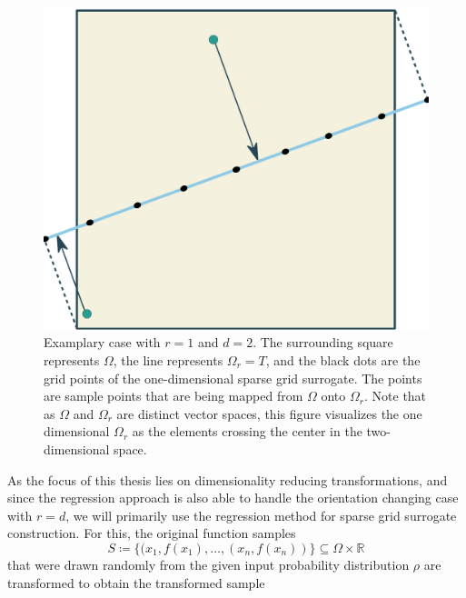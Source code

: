 \documentclass[
  a4paper,  %
  twoside,  %
  bibliography=totoc,
  headsepline,
  cleardoublepage=empty,
  parskip=half,
  draft=false
]{scrbook}
\begin{document}
\begin{mdframed}[style=style]
\begin{figure}[H]
        \centering
\begin{minipage}{.5\textwidth}
        \centering
  \caption{Examplary case with $r=1$ and $d=2$.
  The surrounding \beige square represents $\Omega$, the \lightblue line represents $\Omega_r=T$, and the black dots are the grid points of the one-dimensional sparse grid surrogate.
The \green points are sample points that are being mapped from $\Omega$ onto $\Omega_r$.
Note that as $\Omega$ and $\Omega_r$ are distinct vector spaces, this figure visualizes the one dimensional $\Omega_r$ as the elements crossing the center in the two-dimensional space.}
\label{fig:reduced_grid}
    \end{minipage}%
    \begin{minipage}{0.5\textwidth}
        \centering
   \includegraphics[width=0.85\linewidth]{graphics/reduced_grid}
    \end{minipage}
\end{figure}
\end{mdframed}
%
As the focus of this thesis lies on dimensionality reducing transformations, and since the regression approach is also able to handle the orientation changing case with $r=d$, we will primarily use the regression method for sparse grid surrogate construction.
For this, the original function samples
\begin{equation}
S \coloneqq \{(x_1, f(x_1), \dots, (x_n, f(x_n))\} \subseteq \Omega \times \mathds{R}
\end{equation}
that were drawn randomly from the given input probability distribution $\rho$ are transformed to obtain the transformed sample
\end{document}

